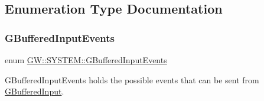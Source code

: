 \subsection{Enumeration Type Documentation}
\mbox{\label{namespaceGW_1_1SYSTEM_a309fd3a92512dd2bfa8065d99c0d7fcb}} 
\subsubsection{\texorpdfstring{GBufferedInputEvents}{GBufferedInputEvents}}
{\footnotesize\ttfamily enum \mbox{\hyperlink{namespaceGW_1_1SYSTEM_a309fd3a92512dd2bfa8065d99c0d7fcb}{G\+W\+::\+S\+Y\+S\+T\+E\+M\+::\+G\+Buffered\+Input\+Events}}}



G\+Buffered\+Input\+Events holds the possible events that can be sent from \mbox{\hyperlink{classGW_1_1SYSTEM_1_1GBufferedInput}{G\+Buffered\+Input}}. 

